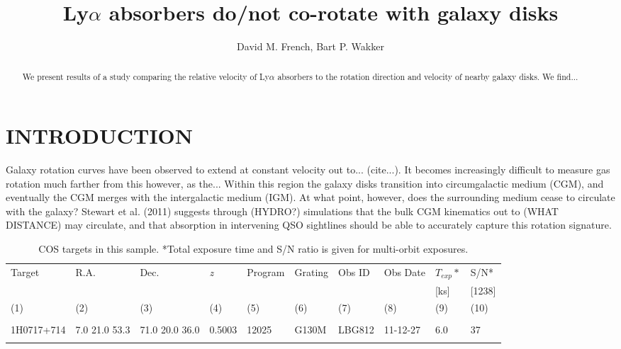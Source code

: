 \documentclass[iop]{emulateapj-rtx4}
\begin{document}
\title{Ly$\alpha$ absorbers do/not co-rotate with galaxy disks}

\author{David M. French, Bart P. Wakker}


\begin{abstract}

We present results of a study comparing the relative velocity of Ly$\alpha$ absorbers to the rotation direction and velocity of nearby galaxy disks. We find...

\end{abstract}




\section{INTRODUCTION}
Galaxy rotation curves have been observed to extend at constant velocity out to... (cite...). It becomes increasingly difficult to measure gas rotation much farther from this however, as the... Within this region the galaxy disks transition into circumgalactic medium (CGM), and eventually the CGM merges with the intergalactic medium (IGM). At what point, however, does the surrounding medium cease to circulate with the galaxy? Stewart et al. (2011) suggests through (HYDRO?) simulations that the bulk CGM kinematics out to (WHAT DISTANCE) may circulate, and that absorption in intervening QSO sightlines should be able to accurately capture this rotation signature.


\begin{table}[ht]\footnotesize
\begin{center}
\begin{tabular}{l l l l l l l l l l}
 \hline \hline
  Target 		& R.A. 		& Dec. 		& \textit{z}		 & Program 	  & Grating 	  & Obs ID 	    & Obs Date 	    & $T_{exp}*$     & S/N*  \\ 
  	    		& 	       		&	  		& 		  	 & 		    	  & 		  	  & 		  	   & 		     	    & 	        [ks]        & [1238] \\ 
 \scriptsize (1)  & \scriptsize (2) & \scriptsize (3) & \scriptsize (4) & \scriptsize (5) & \scriptsize (6) & \scriptsize  (7) & \scriptsize (8) & \scriptsize (9) & \scriptsize (10)  \\ \hline \hline
\\
    
1H0717+714		  &  7.0  21.0   53.3  &     71.0  20.0  36.0  &    0.5003  & 12025  	    &   G130M  &   LBG812  		 & 11-12-27      	 	  &  6.0    &      37         \\

 \\
\hline

\end{tabular}
\end{center}
  \caption{\small{COS targets in this sample. *Total exposure time and S/N ratio is given for multi-orbit exposures.}}
  \label{target_table}
\end{table}
\end{document}
